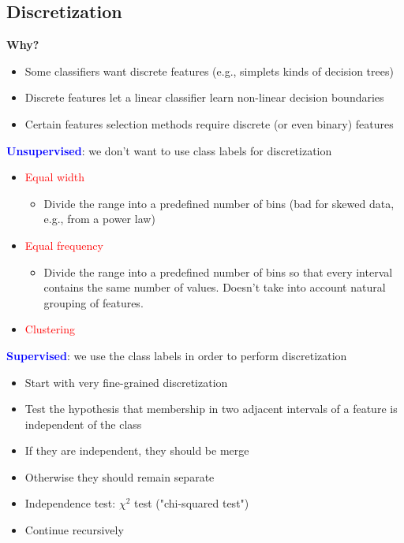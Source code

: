 \documentclass[11pt]{article}
\begin{document}
\subsection*{Discretization}

\textbf{Why?}
\begin{itemize}
	\item Some classifiers want discrete features (e.g., simplets kinds of decision trees)
	\item Discrete features let a linear classifier learn non-linear decision boundaries
	\item Certain features selection methods require discrete (or even binary) features
\end{itemize}

\newpage
\textbf{\textcolor{blue}{Unsupervised}}: we don't want to use class labels for discretization
\begin{itemize}
	\item \textcolor{red}{Equal width}
		\begin{itemize}
			\item Divide the range into a predefined number of bins (bad for skewed data, e.g., from a power law)
		\end{itemize}
	\item \textcolor{red}{Equal frequency}
		\begin{itemize}
			\item Divide the range into a predefined number of bins so that every interval contains the same number of values. Doesn't take into account natural grouping of features.
		\end{itemize}
	\item \textcolor{red}{Clustering}
\end{itemize}

\textbf{\textcolor{blue}{Supervised}}: we use the class labels in order to perform discretization
\begin{itemize}
	\item Start with very fine-grained discretization
	\item Test the hypothesis that membership in two adjacent intervals of a feature is independent of the class
	\item If they are independent, they should be merge
	\item Otherwise they should remain separate 
	\item Independence test: $\chi^{2}$ test ("chi-squared test")
	\item Continue recursively
\end{itemize}
\end{document}
